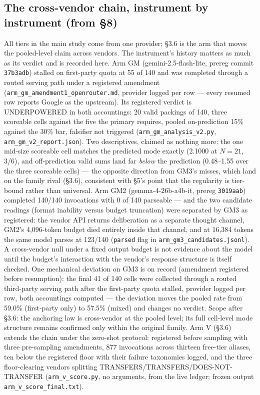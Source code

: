 \subsection{The cross-vendor chain, instrument by instrument (from \S8)}

All tiers in the main study come from one provider; \S3.6 is the arm that moves the pooled-level
claim across vendors. The instrument's history matters as much as its verdict and is recorded
here. Arm GM (gemini-2.5-flash-lite, prereg commit \texttt{37b3adb}) stalled on first-party quota at
55 of 140 and was completed through a routed serving path under a registered amendment
(\texttt{arm\_gm\_amendment1\_openrouter.md}, provider logged per row --- every resumed row reports
Google as the upstream). Its registered verdict is UNDERPOWERED in both accountings: 20
valid packings of 140, three scoreable cells against the five the primary requires, pooled
on-prediction 15\% against the 30\% bar, falsifier not triggered
(\texttt{arm\_gm\_analysis\_v2.py}, \texttt{arm\_gm\_v2\_report.json}). Two descriptives, claimed as nothing
more: the one mid-size scoreable cell matches the predicted mode exactly (2.1000 at $N = 21$,
3/6), and off-prediction valid sums land far \emph{below} the prediction (0.48--1.55 over the three scoreable cells) --- the
opposite direction from GM3's misses, which land on the family rival (\S3.6), consistent
with \S5's point that the regularity is
tier-bound rather than universal. Arm GM2 (gemma-4-26b-a4b-it, prereg
\texttt{3019aab}) completed 140/140 invocations with 0 of 140 parseable --- and the two
candidate readings (format inability versus budget truncation) were separated by GM3 as
registered: the vendor API returns deliberation as a separate thought channel, GM2's
4,096-token budget died entirely inside that channel, and at 16,384 tokens the same model
parses at 123/140 (\texttt{parsed} flag in \texttt{arm\_gm3\_candidates.jsonl}). A cross-vendor null under a fixed output budget is not evidence about the
model until the budget's interaction with the vendor's response structure is itself checked.
One mechanical deviation on GM3 is on record (amendment registered before resumption): the
final 41 of 140 cells were collected through a routed third-party serving path after the
first-party quota stalled, provider logged per row, both accountings computed --- the
deviation moves the pooled rate from 59.0\% (first-party only) to 57.5\% (mixed) and changes
no verdict. Scope after \S3.6: the anchoring law is cross-vendor at the pooled level; its
full cell-level mode structure remains confirmed only within the original family. Arm V
(\S3.6) extends the chain under the zero-shot protocol: registered before sampling with three
pre-sampling amendments, 877 invocations across thirteen free-tier aliases, ten below the
registered floor with their failure taxonomies logged, and the three floor-clearing vendors
splitting TRANSFERS/TRANSFERS/DOES-NOT-TRANSFER (\texttt{arm\_v\_score.py}, no arguments, from the
live ledger; frozen output \texttt{arm\_v\_score\_final.txt}).


